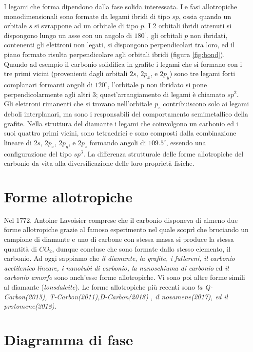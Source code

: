 \documentclass[a4paper,titlepage]{book}
\begin{document}
I legami che forma dipendono dalla fase solida interessata. Le fasi allotropiche monodimensionali sono formate da legami ibridi di tipo $sp$, ossia quando un orbitale $s$ si svrappone ad un orbitale di tipo $p$. I 2 orbitali ibridi ottenuti si dispongono lungo un asse con un angolo di $180^\circ$, gli orbitali $p$ non ibridati, contenenti gli elettroni non legati, si dispongono perpendicolari tra loro, ed il piano formato risulta perpendicolare agli orbitali ibridi (figura \ref{fig:bond}). Quando ad esempio il carbonio solidifica in grafite i legami che si formano con i tre primi vicini (provenienti dagli orbitali $2s$, $2p_x$, e $2p_y$) sono tre legami forti complanari formanti angoli di $120^\circ$, l'orbitale p non ibridato si pone perpendicolarmente agli altri 3; quest'arrangiamento di legami è chiamato $sp^2$. Gli elettroni rimanenti che si trovano nell'orbitale  $p_z$ contribuiscono solo ai legami deboli interplanari, ma sono i responsabili del comportamento semimetallico della grafite. Nella struttura del diamante i legami che coinvolgono un carbonio ed i suoi quattro primi vicini, sono tetraedrici e sono composti dalla combinazione lineare di $2s$, $2p_x$, $2p_y$, e $2p_z$ formando angoli di $109.5^\circ$, essendo una configurazione del tipo $sp^3$. La differenza strutturale delle forme allotropiche del carbonio da vita alla diversificazione delle loro proprietà fisiche.

\section{Forme allotropiche}


Nel 1772, Antoine Lavoisier comprese che il carbonio disponeva di almeno due forme allotropiche grazie al famoso esperimento nel quale scoprì che bruciando un campione di diamante e uno di carbone con stessa massa si produce la stessa quantità di $CO_2$, dunque concluse che sono formate dallo stesso elemento, il carbonio. Ad oggi sappiamo che \textit{il diamante, la grafite, i fullereni, il carbonio acetilenico lineare, i nanotubi di carbonio, la nanoschiuma di carbonio} ed \textit{il carbonio amorfo} sono anch'esse forme allotropiche. Vi sono poi altre forme simili al diamante (\textit{lonsdaleite}). Le forme allotropiche più recenti sono \textit{la Q-Carbon(2015), T-Carbon(2011),D-Carbon(2018) , il novamene(2017), ed il protomene(2018)}.

\section {Diagramma di fase}
\end{document}
